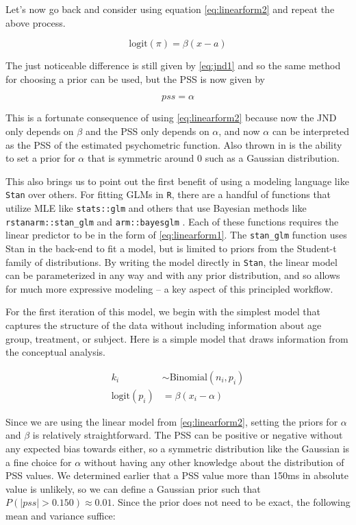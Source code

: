 \documentclass[11pt, oneside, openany]{scrbook}
\begin{document}
Let's now go back and consider using equation \eqref{eq:linearform2} and repeat the above process.

\begin{equation}
  \mathrm{logit}(\pi) = \beta(x - a)
  \label{eq:pfform2}
\end{equation}

The just noticeable difference is still given by \eqref{eq:jnd1} and so the same method for choosing a prior can be used, but the PSS is now given by

\[pss = \alpha\]

This is a fortunate consequence of using \eqref{eq:linearform2} because now the JND only depends on \(\beta\) and the PSS only depends on \(\alpha\), and now \(\alpha\) can be interpreted as the PSS of the estimated psychometric function. Also thrown in is the ability to set a prior for \(\alpha\) that is symmetric around \(0\) such as a Gaussian distribution.

This also brings us to point out the first benefit of using a modeling language like \texttt{Stan} over others. For fitting GLMs in \texttt{R}, there are a handful of functions that utilize MLE like \texttt{stats::glm} and others that use Bayesian methods like \texttt{rstanarm::stan\_glm} and \texttt{arm::bayesglm} \citep{R-rstanarm, R-arm}. Each of these functions requires the linear predictor to be in the form of \eqref{eq:linearform1}. The \texttt{stan\_glm} function uses Stan in the back-end to fit a model, but is limited to priors from the Student-t family of distributions. By writing the model directly in \texttt{Stan}, the linear model can be parameterized in any way and with any prior distribution, and so allows for much more expressive modeling -- a key aspect of this principled workflow.

For the first iteration of this model, we begin with the simplest model that captures the structure of the data without including information about age group, treatment, or subject. Here is a simple model that draws information from the conceptual analysis.

\begin{align*}
  k_i &\sim \mathrm{Binomial}(n_i, p_i) \\
  \mathrm{logit}(p_i) &= \beta ( x_i - \alpha )
\end{align*}

Since we are using the linear model from \eqref{eq:linearform2}, setting the priors for \(\alpha\) and \(\beta\) is relatively straightforward. The PSS can be positive or negative without any expected bias towards either, so a symmetric distribution like the Gaussian is a fine choice for \(\alpha\) without having any other knowledge about the distribution of PSS values. We determined earlier that a PSS value more than 150ms in absolute value is unlikely, so we can define a Gaussian prior such that \(P(|pss| > 0.150) \approx 0.01\). Since the prior does not need to be exact, the following mean and variance suffice:
\end{document}
